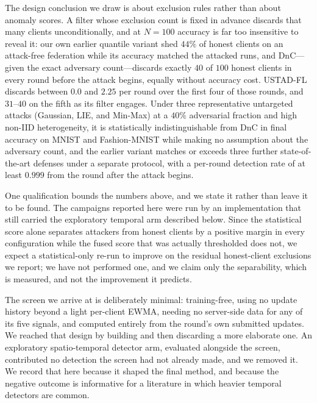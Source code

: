 \documentclass[journal]{IEEEtran}
\begin{document}
The design conclusion we draw is about exclusion rules rather than about anomaly scores. A filter whose exclusion count is fixed in advance discards that many clients unconditionally, and at $N=100$ accuracy is far too insensitive to reveal it: our own earlier quantile variant shed $44\%$ of honest clients on an attack-free federation while its accuracy matched the attacked runs, and DnC---given the exact adversary count---discards exactly $40$ of $100$ honest clients in every round before the attack begins, equally without accuracy cost. USTAD-FL discards between $0.0$ and $2.25$ per round over the first four of those rounds, and $31$--$40$ on the fifth as its filter engages. Under three representative untargeted attacks (Gaussian, LIE, and Min-Max) at a $40\%$ adversarial fraction and high non-IID heterogeneity, it is statistically indistinguishable from DnC in final accuracy on MNIST and Fashion-MNIST while making no assumption about the adversary count, and the earlier variant matches or exceeds three further state-of-the-art defenses under a separate protocol, with a per-round detection rate of at least $0.999$ from the round after the attack begins.

One qualification bounds the numbers above, and we state it rather than leave it to be found. The campaigns reported here were run by an implementation that still carried the exploratory temporal arm described below. Since the statistical score alone separates attackers from honest clients by a positive margin in every configuration while the fused score that was actually thresholded does not, we expect a statistical-only re-run to improve on the residual honest-client exclusions we report; we have not performed one, and we claim only the separability, which is measured, and not the improvement it predicts.

The screen we arrive at is deliberately minimal: training-free, using no update history beyond a light per-client EWMA, needing no server-side data for any of its five signals, and computed entirely from the round's own submitted updates. We reached that design by building and then discarding a more elaborate one. An exploratory spatio-temporal detector arm, evaluated alongside the screen, contributed no detection the screen had not already made, and we removed it. We record that here because it shaped the final method, and because the negative outcome is informative for a literature in which heavier temporal detectors are common.
\end{document}
